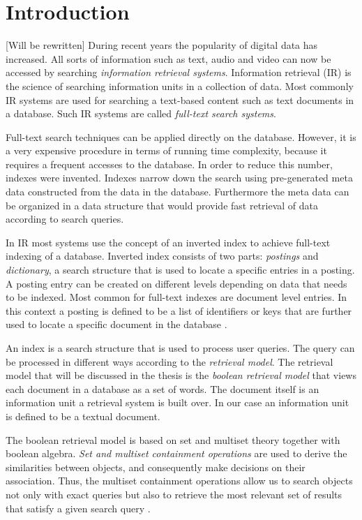 \section{Introduction} \label{c:introduction}
[Will be rewritten]
%
During recent years the popularity of digital data has increased. All sorts of 
information such as text, audio and video can now be accessed by searching 
\emph{information retrieval systems}. Information retrieval (IR) is the science of 
searching information units in a collection of data. Most commonly IR systems 
are used for searching a text-based content such as text documents in a database. 
Such IR systems are called \emph{full-text search systems}. 

Full-text search techniques can be applied directly on the database. However, 
it is a very expensive procedure in terms of running time complexity, because it 
requires a frequent accesses to the database. In order to reduce this number, indexes 
were invented. Indexes narrow down the search using pre-generated meta data 
constructed from the data in the database. Furthermore the meta data can be 
organized in a data structure that would provide fast retrieval of data according 
to search queries.

In IR most systems use the concept of an inverted index to achieve full-text 
indexing of a database. Inverted index consists of two parts: \emph{postings} 
and \emph{dictionary}, a search structure that is used to locate a specific entries 
in a posting. A posting entry can be created on different levels depending on data 
that needs to be indexed. Most common for full-text indexes are document level 
entries. In this context a posting is defined to be a list of identifiers or keys that are 
further used to locate a specific document in the database \cite{zobel1992efficient}.

An index is a search structure that is used to process user queries. The query 
can be processed in different ways according to the \emph{retrieval model}. The 
retrieval model that will be discussed in the thesis is the \emph{boolean retrieval 
model} that views each document in a database as a set of words. The document 
itself is an information unit a retrieval system is built over. In our case an 
information unit is defined to be a textual document. 

The boolean retrieval model is based on set and multiset theory together with 
boolean algebra. \emph{Set and multiset containment operations} are used to 
derive the similarities between objects, and consequently make decisions on their 
association. Thus, the multiset containment operations allow us to 
search objects not only with exact queries but also to retrieve the most relevant 
set of results that satisfy a given search query \cite{baeza1999modern,manning2008introduction,zobel2006inverted}.

